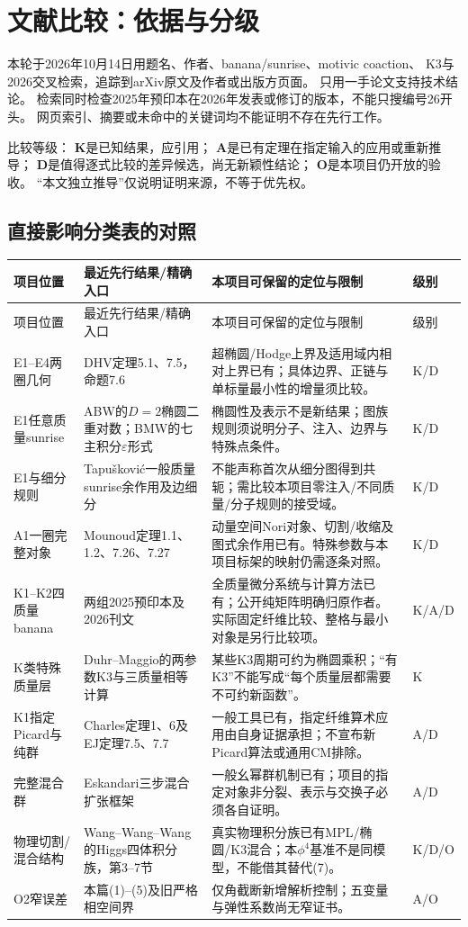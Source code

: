 \documentclass[11pt,a4paper]{ctexart}
\theoremstyle{cnplain}\newtheorem{proposition}{命题}[section]
\begin{document}
\section{文献比较：依据与分级}
本轮于2026年10月14日用题名、作者、banana/sunrise、motivic coaction、
K3与2026交叉检索，追踪到arXiv原文及作者或出版方页面。
只用一手论文支持技术结论。
检索同时检查2025年预印本在2026年发表或修订的版本，不能只搜编号26开头。
网页索引、摘要或未命中的关键词均不能证明不存在先行工作。

比较等级：
\textbf{K}是已知结果，应引用；
\textbf{A}是已有定理在指定输入的应用或重新推导；
\textbf{D}是值得逐式比较的差异候选，尚无新颖性结论；
\textbf{O}是本项目仍开放的验收。
“本文独立推导”仅说明证明来源，不等于优先权。

\subsection{直接影响分类表的对照}
\small
\setlength{\tabcolsep}{5pt}
\begin{longtable}{p{}p{}p{}p{}}
\toprule
项目位置 & 最近先行结果/精确入口 & 本项目可保留的定位与限制 & 级别\\\midrule
\endfirsthead
\toprule 项目位置 & 最近先行结果/精确入口 & 本项目可保留的定位与限制 & 级别\\\midrule
\endhead
E1--E4两圈几何 &
DHV定理5.1、7.5，命题7.6\cite{DHV} &
超椭圆/Hodge上界及适用域内相对上界已有；具体边界、正链与单标量最小性的增量须比较。 & K/D\\
E1任意质量sunrise &
ABW的$D=2$椭圆二重对数；BMW的七主积分$\varepsilon$形式\cite{ABW,BMW} &
椭圆性及表示不是新结果；图族规则须说明分子、注入、边界与特殊点条件。 & K/D\\
E1与细分规则 &
Tapušković一般质量sunrise余作用及边细分\cite{Tap} &
不能声称首次从细分图得到共轭；需比较本项目零注入/不同质量/分子规则的接受域。 & K/D\\
A1一圈完整对象 &
Mounoud定理1.1、1.2、7.26、7.27\cite{Mou} &
动量空间Nori对象、切割/收缩及图式余作用已有。特殊参数与本项目标架的映射仍需逐条对照。 & K/D\\
K1--K2四质量banana &
两组2025预印本及2026刊文\cite{DMPS,PTWW} &
全质量微分系统与计算方法已有；公开纯矩阵明确归原作者。实际固定纤维比较、整格与最小对象是另行比较项。 & K/A/D\\
K类特殊质量层 &
Duhr--Maggio的两参数K3与三质量相等计算\cite{DM,DMfull} &
某些K3周期可约为椭圆乘积；“有K3”不能写成“每个质量层都需要不可约新函数”。 & K\\
K1指定Picard与纯群 &
Charles定理1、6及EJ定理7.5、7.7\cite{Charles,EJ} &
一般工具已有，指定纤维算术应用由自身证据承担；不宣布新Picard算法或通用CM排除。 & A/D\\
完整混合群 &
Eskandari三步混合扩张框架\cite{Esk} &
一般幺幂群机制已有；项目的指定对象非分裂、表示与交换子必须各自证明。 & A/D\\
物理切割/混合结构 &
Wang--Wang--Wang的Higgs四体积分族，第3--7节\cite{WWW} &
真实物理积分族已有MPL/椭圆/K3混合；本$\phi^4$基准不是同模型，不能借其替代(7)。 & K/D/O\\
O2窄误差 &
本篇(1)--(5)及旧严格相空间界 &
仅角截断新增解析控制；五变量与弹性系数尚无窄证书。 & A/O\\
\bottomrule
\end{longtable}
\end{document}
